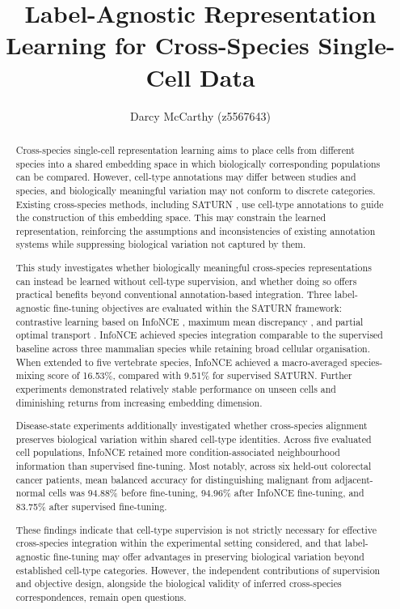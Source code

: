 \documentclass{article}
\title{Label-Agnostic Representation Learning for Cross-Species Single-Cell Data}
\author{Darcy McCarthy (z5567643)}
\begin{document}
\maketitle

\begin{abstract}
Cross-species single-cell representation learning aims to place cells from different species into a shared embedding space in which biologically corresponding populations can be compared. However, cell-type annotations may differ between studies and species, and biologically meaningful variation may not conform to discrete categories. Existing cross-species methods, including SATURN \cite{SATURN}, use cell-type annotations to guide the construction of this embedding space. This may constrain the learned representation, reinforcing the assumptions and inconsistencies of existing annotation systems while suppressing biological variation not captured by them.

This study investigates whether biologically meaningful cross-species representations can instead be learned without cell-type supervision, and whether doing so offers practical benefits beyond conventional annotation-based integration. Three label-agnostic fine-tuning objectives are evaluated within the SATURN framework: contrastive learning based on InfoNCE \cite{InfoNCE}, maximum mean discrepancy \cite{MMD-MA}, and partial optimal transport \cite{OT}. InfoNCE achieved species integration comparable to the supervised baseline across three mammalian species while retaining broad cellular organisation. When extended to five vertebrate species, InfoNCE achieved a macro-averaged species-mixing score of 16.53\%, compared with 9.51\% for supervised SATURN. Further experiments demonstrated relatively stable performance on unseen cells and diminishing returns from increasing embedding dimension.

Disease-state experiments additionally investigated whether cross-species alignment preserves biological variation within shared cell-type identities. Across five evaluated cell populations, InfoNCE retained more condition-associated neighbourhood information than supervised fine-tuning. Most notably, across six held-out colorectal cancer patients, mean balanced accuracy for distinguishing malignant from adjacent-normal cells was 94.88\% before fine-tuning, 94.96\% after InfoNCE fine-tuning, and 83.75\% after supervised fine-tuning.

These findings indicate that cell-type supervision is not strictly necessary for effective cross-species integration within the experimental setting considered, and that label-agnostic fine-tuning may offer advantages in preserving biological variation beyond established cell-type categories. However, the independent contributions of supervision and objective design, alongside the biological validity of inferred cross-species correspondences, remain open questions.
\end{abstract}
\end{document}
